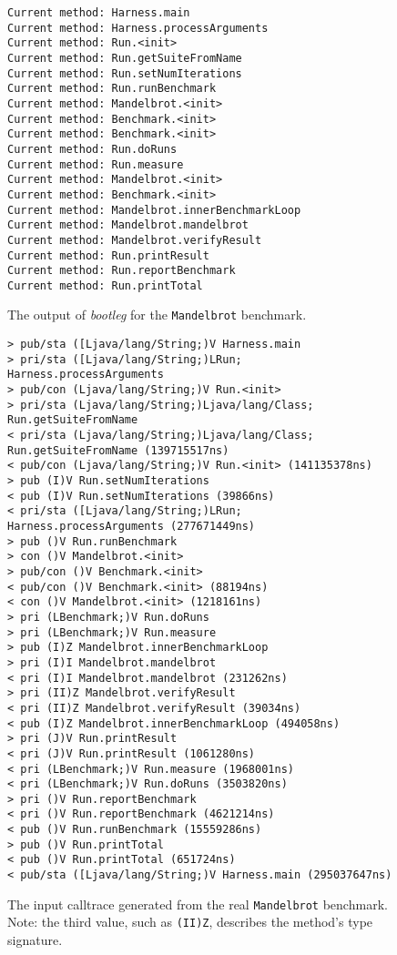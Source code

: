 \documentclass[12pt]{article}
\begin{document}
\begin{figure}[h!]
\begin{verbatim}
Current method: Harness.main
Current method: Harness.processArguments
Current method: Run.<init>
Current method: Run.getSuiteFromName
Current method: Run.setNumIterations
Current method: Run.runBenchmark
Current method: Mandelbrot.<init>
Current method: Benchmark.<init>
Current method: Benchmark.<init>
Current method: Run.doRuns
Current method: Run.measure
Current method: Mandelbrot.<init>
Current method: Benchmark.<init>
Current method: Mandelbrot.innerBenchmarkLoop
Current method: Mandelbrot.mandelbrot
Current method: Mandelbrot.verifyResult
Current method: Run.printResult
Current method: Run.reportBenchmark
Current method: Run.printTotal
\end{verbatim}
\captionsetup{justification=centering}
\caption{The output of \textit{bootleg} for the \texttt{Mandelbrot} benchmark.}
\label{fig:mandelbrot_output}
\end{figure}

\begin{figure}[h!]
\begin{Verbatim}[fontsize=\small]
> pub/sta ([Ljava/lang/String;)V Harness.main
> pri/sta ([Ljava/lang/String;)LRun; Harness.processArguments
> pub/con (Ljava/lang/String;)V Run.<init>
> pri/sta (Ljava/lang/String;)Ljava/lang/Class; Run.getSuiteFromName
< pri/sta (Ljava/lang/String;)Ljava/lang/Class; Run.getSuiteFromName (139715517ns)
< pub/con (Ljava/lang/String;)V Run.<init> (141135378ns)
> pub (I)V Run.setNumIterations
< pub (I)V Run.setNumIterations (39866ns)
< pri/sta ([Ljava/lang/String;)LRun; Harness.processArguments (277671449ns)
> pub ()V Run.runBenchmark
> con ()V Mandelbrot.<init>
> pub/con ()V Benchmark.<init>
< pub/con ()V Benchmark.<init> (88194ns)
< con ()V Mandelbrot.<init> (1218161ns)
> pri (LBenchmark;)V Run.doRuns
> pri (LBenchmark;)V Run.measure
> pub (I)Z Mandelbrot.innerBenchmarkLoop
> pri (I)I Mandelbrot.mandelbrot
< pri (I)I Mandelbrot.mandelbrot (231262ns)
> pri (II)Z Mandelbrot.verifyResult
< pri (II)Z Mandelbrot.verifyResult (39034ns)
< pub (I)Z Mandelbrot.innerBenchmarkLoop (494058ns)
> pri (J)V Run.printResult
< pri (J)V Run.printResult (1061280ns)
< pri (LBenchmark;)V Run.measure (1968001ns)
< pri (LBenchmark;)V Run.doRuns (3503820ns)
> pri ()V Run.reportBenchmark
< pri ()V Run.reportBenchmark (4621214ns)
< pub ()V Run.runBenchmark (15559286ns)
> pub ()V Run.printTotal
< pub ()V Run.printTotal (651724ns)
< pub/sta ([Ljava/lang/String;)V Harness.main (295037647ns)
\end{Verbatim}
\captionsetup{justification=centering}
\caption{The input calltrace generated from the real \texttt{Mandelbrot} benchmark. Note: the third value, such as \texttt{(II)Z}, describes the method's type signature.}
\label{fig:mandelbrot_ct}
\end{figure}
\end{document}
